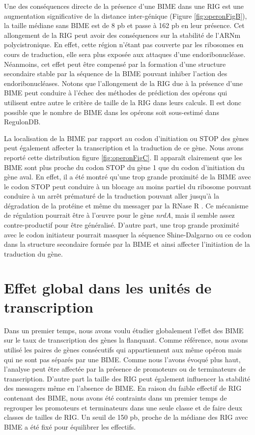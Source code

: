\documentclass[12pt,a4paper]{report}
\begin{document}
\begin{onehalfspace}
Une des conséquences directe de la présence d'une BIME dans une RIG est une augmentation significative de la distance inter-génique (Figure \autoref{fig:operonFigB}), la taille médiane sans BIME est de 8 pb et passe à 162 pb en leur présence. Cet allongement de la RIG peut avoir des conséquences sur la stabilité de l'ARNm polycistronique. En effet, cette région n'étant pas couverte par les ribosomes en cours de traduction, elle sera plus exposée aux attaques d'une endoribonucléase. Néanmoins, cet effet peut être compensé par la formation d'une structure secondaire stable par la séquence de la BIME pouvant inhiber l'action des endoribonucléases. Notons que l'allongement de la RIG due à la présence d'une BIME peut conduire à l'échec des méthodes de prédiction des opérons qui utilisent entre autre le critère de taille de la RIG dans leurs calculs. Il est donc possible que le nombre de BIME dans les opérons soit sous-estimé dans RegulonDB.

La localisation de la BIME par rapport au codon d’initiation ou STOP des gènes peut également affecter la transcription et la traduction de ce gène.  Nous avons reporté cette distribution figure \autoref{fig:operonFigC}. Il apparaît clairement que les BIME sont plus proche du codon STOP du gène 1 que du codon d’initiation du gène aval. En effet, il a été montré qu’une trop grande proximité de la BIME avec le codon STOP peut conduire à un blocage au moins partiel du ribosome pouvant conduire à un arrêt prématuré de la traduction pouvant aller jusqu’à la dégradation de la protéine et même du messager par la RNase R \citep{Liang2015}. Ce mécanisme de régulation pourrait être à l’œuvre pour le gène \textit{nrdA}, mais il semble assez contre-productif pour être généralisé. D’autre part, une trop grande proximité avec le codon initiateur pourrait masquer la séquence Shine-Dalgarno ou ce codon dans la structure secondaire formée par la BIME et ainsi affecter l’initiation de la traduction du gène.

\section*{Effet global dans les unités de transcription}

Dans un premier temps, nous avons voulu étudier globalement l'effet des BIME sur le taux de transcription des gènes la flanquant. Comme référence, nous avons utilisé les paires de gènes consécutifs qui appartiennent aux même opéron mais qui ne sont pas séparés par une BIME. Comme nous l'avons évoqué plus haut, l'analyse peut être affectée par la présence de promoteurs ou de terminateurs de transcription. D'autre part la taille des RIG peut également influencer la stabilité des messagers même en l'absence de BIME. En raison du faible effectif de RIG contenant des BIME, nous avons été contraints dans un premier temps de regrouper les promoteurs et terminateurs dans une seule classe et de faire deux classes de tailles de RIG. Un seuil de 150 pb, proche de la médiane des RIG avec BIME a été fixé pour équilibrer les effectifs.


\end{onehalfspace}
\end{document}
